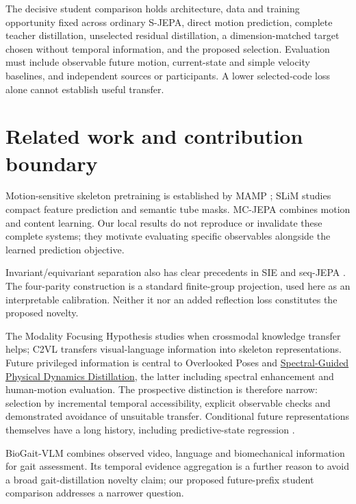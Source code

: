 \documentclass{article}
\begin{document}
The decisive student comparison holds architecture, data and training opportunity fixed across ordinary S-JEPA, direct motion prediction, complete teacher distillation, unselected residual distillation, a dimension-matched target chosen without temporal information, and the proposed selection. Evaluation must include observable future motion, current-state and simple velocity baselines, and independent sources or participants. A lower selected-code loss alone cannot establish useful transfer.

\section{Related work and contribution boundary}\label{related-work-and-contribution-boundary}

Motion-sensitive skeleton pretraining is established by MAMP \citep{mao2023mamp}; SLiM \citep{do2026slim} studies compact feature prediction and semantic tube masks. MC-JEPA \citep{bardes2023mcjepa} combines motion and content learning. Our local results do not reproduce or invalidate these complete systems; they motivate evaluating specific observables alongside the learned prediction objective.

Invariant/equivariant separation also has clear precedents in SIE \citep{garrido2023sie} and seq-JEPA \citep{ghaemi2025seqjepa}. The four-parity construction is a standard finite-group projection, used here as an interpretable calibration. Neither it nor an added reflection loss constitutes the proposed novelty.

The Modality Focusing Hypothesis \citep{xue2023modality} studies when crossmodal knowledge transfer helps; C2VL \citep{chen2024c2vl} transfers visual-language information into skeleton representations. Future privileged information is central to Overlooked Poses \citep{sun2022overlooked} and \href{https://openreview.net/pdf?id=P6F4MxtOKp}{Spectral-Guided Physical Dynamics Distillation}, the latter including spectral enhancement and human-motion evaluation. The prospective distinction is therefore narrow: selection by incremental temporal accessibility, explicit observable checks and demonstrated avoidance of unsuitable transfer. Conditional future representations themselves have a long history, including predictive-state regression \citep{hefny2015predictive}.

BioGait-VLM \citep{chen2026biogait} combines observed video, language and biomechanical information for gait assessment. Its temporal evidence aggregation is a further reason to avoid a broad gait-distillation novelty claim; our proposed future-prefix student comparison addresses a narrower question.
\end{document}
